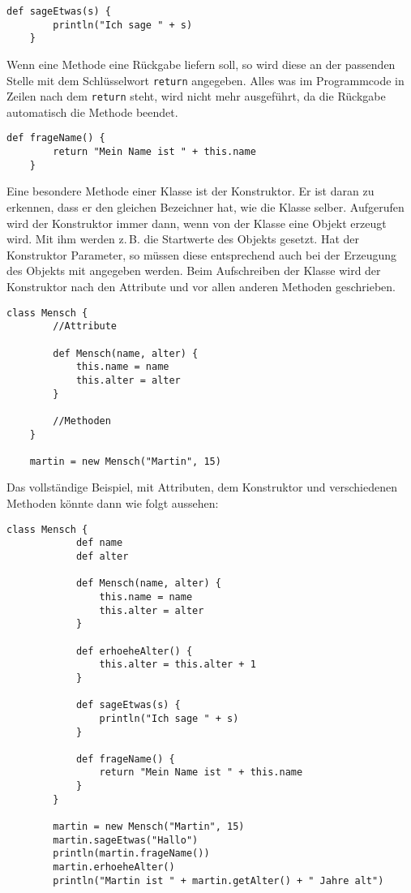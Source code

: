 \documentclass[11pt,a4paper,parskip=half]{scrartcl}
\begin{document}
\begin{lstlisting}[gobble=2]
	def sageEtwas(s) {
		println("Ich sage " + s)
	}
\end{lstlisting}

Wenn eine Methode eine Rückgabe liefern soll, so wird diese an der passenden Stelle mit dem Schlüsselwort \lstinline|return| angegeben. Alles was im Programmcode in Zeilen nach dem \lstinline|return| steht, wird nicht mehr ausgeführt, da die Rückgabe automatisch die Methode beendet.

\begin{lstlisting}[gobble=2]
	def frageName() {
		return "Mein Name ist " + this.name
	}
\end{lstlisting}

Eine besondere Methode einer Klasse ist der Konstruktor. Er ist daran zu erkennen, dass er den gleichen Bezeichner hat, wie die Klasse selber. Aufgerufen wird der Konstruktor immer dann, wenn von der Klasse eine Objekt erzeugt wird. Mit ihm werden z.\,B. die Startwerte des Objekts gesetzt. Hat der Konstruktor Parameter, so müssen diese entsprechend auch bei der Erzeugung des Objekts mit angegeben werden. Beim Aufschreiben der Klasse wird der Konstruktor nach den Attribute und vor allen anderen Methoden geschrieben.

\begin{lstlisting}[gobble=2]
	class Mensch {
		//Attribute

		def Mensch(name, alter) {
			this.name = name
			this.alter = alter
		}

		//Methoden
	}

	martin = new Mensch("Martin", 15)
\end{lstlisting}

Das vollständige Beispiel, mit Attributen, dem Konstruktor und verschiedenen Methoden könnte dann wie folgt aussehen:

\begin{multicols}{2}
	\begin{lstlisting}[gobble=4]
		class Mensch {
			def name
			def alter

			def Mensch(name, alter) {
				this.name = name
				this.alter = alter
			}

			def erhoeheAlter() {
				this.alter = this.alter + 1
			}

			def sageEtwas(s) {
				println("Ich sage " + s)
			}

			def frageName() {
				return "Mein Name ist " + this.name
			}
		}

		martin = new Mensch("Martin", 15)
		martin.sageEtwas("Hallo")
		println(martin.frageName())
		martin.erhoeheAlter()
		println("Martin ist " + martin.getAlter() + " Jahre alt")
	\end{lstlisting}
\end{multicols}
\end{document}
